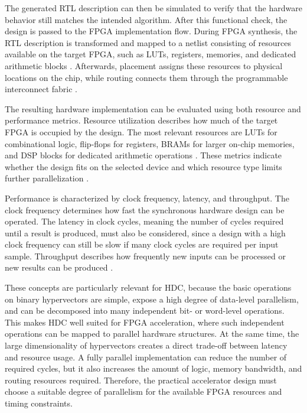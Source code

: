         The generated \ac{RTL} description can then be simulated to verify that the hardware behavior still matches the intended algorithm. After this functional check, the design is passed to the \ac{FPGA} implementation flow. During FPGA synthesis, the \ac{RTL} description is transformed and mapped to a netlist consisting of resources available on the target \ac{FPGA}, such as \acp{LUT}, registers, memories, and dedicated arithmetic blocks \cite{amd_vivado_2026}. Afterwards, placement assigns these resources to physical locations on the chip, while routing connects them through the programmable interconnect fabric \cite{amd_vivado_nodate}.
    

        The resulting hardware implementation can be evaluated using both resource and performance metrics. Resource utilization describes how much of the target \ac{FPGA} is occupied by the design. The most relevant resources are \ac{LUT}s for combinational logic, flip-flops for registers, \acp{BRAM} for larger on-chip memories, and \ac{DSP} blocks for dedicated arithmetic operations \cite{nane_survey_2016}. These metrics indicate whether the design fits on the selected device and which resource type limits further parallelization \cite{imani_fach_2019}.

        Performance is characterized by clock frequency, latency, and throughput. The clock frequency determines how fast the synchronous hardware design can be operated. The latency in clock cycles, meaning the number of cycles required until a result is produced, must also be considered, since a design with a high clock frequency can still be slow if many clock cycles are required per input sample. Throughput describes how frequently new inputs can be processed or new results can be produced \cite{nane_survey_2016}. 

        These concepts are particularly relevant for \ac{HDC}, because the basic operations on binary hypervectors are simple, expose a high degree of data-level parallelism, and can be decomposed into many independent bit- or word-level operations. This makes \ac{HDC} well suited for FPGA acceleration, where such independent operations can be mapped to parallel hardware structures. At the same time, the large dimensionality of hypervectors creates a direct trade-off between latency and resource usage. A fully parallel implementation can reduce the number of required cycles, but it also increases the amount of logic, memory bandwidth, and routing resources required. Therefore, the practical accelerator design must choose a suitable degree of parallelism for the available FPGA resources and timing constraints.

